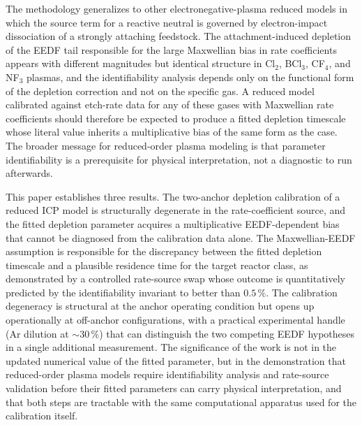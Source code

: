 The methodology generalizes to other electronegative-plasma reduced
models in which the source term for a reactive neutral is governed
by electron-impact dissociation of a strongly attaching feedstock.
The attachment-induced depletion of the EEDF tail responsible for
the large Maxwellian bias in \sfsix{} rate coefficients appears
with different magnitudes but identical structure in Cl$_2$,
BCl$_3$, CF$_4$, and NF$_3$ plasmas, and the identifiability
analysis depends only on the functional form of the depletion
correction and not on the specific gas. A reduced model calibrated
against etch-rate data for any of these gases with Maxwellian rate
coefficients should therefore be expected to produce a fitted
depletion timescale whose literal value inherits a multiplicative
bias of the same form as the \sfsix{} case. The broader message
for reduced-order plasma modeling is that parameter identifiability
is a prerequisite for physical interpretation, not a diagnostic to
run afterwards.

This paper establishes three results. The two-anchor depletion
calibration of a reduced \sfsix{} ICP model is structurally
degenerate in the rate-coefficient source, and the fitted
depletion parameter acquires a multiplicative EEDF-dependent bias
that cannot be diagnosed from the calibration data alone. The
Maxwellian-EEDF assumption is responsible for the discrepancy
between the fitted depletion timescale and a plausible residence
time for the target reactor class, as demonstrated by a controlled
rate-source swap whose outcome is quantitatively predicted by the
identifiability invariant to better than $0.5\,\%$. The calibration
degeneracy is structural at the anchor operating condition but
opens up operationally at off-anchor configurations, with a
practical experimental handle (Ar dilution at $\sim\!30\,\%$) that
can distinguish the two competing EEDF hypotheses in a single
additional measurement. The significance of the work is not in the
updated numerical value of the fitted parameter, but in the
demonstration that reduced-order plasma models require
identifiability analysis and rate-source validation before their
fitted parameters can carry physical interpretation, and that both
steps are tractable with the same computational apparatus used for
the calibration itself.
